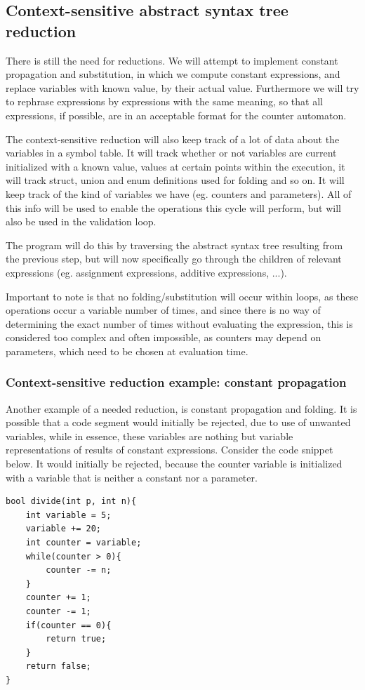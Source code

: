 \documentclass[12pt]{article}
\begin{document}
\subsection{Context-sensitive abstract syntax tree reduction}
There is still the need for 
 reductions. We will attempt to implement constant propagation and substitution, in which we compute constant expressions, and replace variables with known value, by their actual value. Furthermore we will try to rephrase expressions by expressions with the same meaning, so that all expressions, if possible, are in an acceptable format for the counter automaton.

The context-sensitive reduction will also keep track of a lot of data about the variables in a symbol table. It will track whether or not variables are current initialized with a known value, values at certain points within the execution, it will track struct, union and enum definitions used for folding and so on. It will keep track of the kind of variables we have (eg. counters and parameters). All of this info will be used to enable the operations this cycle will perform, but will also be used in the validation loop.

The program will do this by traversing the abstract syntax tree resulting from the previous step, but will now specifically go through the children of relevant expressions (eg. assignment expressions, additive expressions, ...).

Important to note is that no folding/substitution will occur within loops, as these operations occur a variable number of times, and since there is no way of determining the exact number of times without evaluating the expression, this is considered too complex and often impossible, as counters may depend on parameters, which need to be chosen at evaluation time.


\subsubsection{Context-sensitive reduction example: constant propagation}
Another example of a needed reduction, is constant propagation and folding. It is possible that a code segment would initially be rejected, due to use of unwanted variables, while in essence, these variables are nothing but variable representations of results of constant expressions. Consider the code snippet below. It would initially be rejected, because the counter variable is initialized with a variable that is neither a constant nor a parameter.
\newpage
\begin{lstlisting}[style=CStyle]
bool divide(int p, int n){
	int variable = 5;
	variable += 20;
	int counter = variable;
	while(counter > 0){
		counter -= n;
	}
	counter += 1;
	counter -= 1;
	if(counter == 0){
		return true;
	}
	return false;
}
\end{lstlisting}
\end{document}

